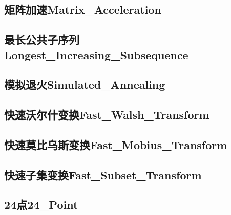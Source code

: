 \documentclass[10pt,a4paper]{article}
\begin{document}
\subsection{矩阵加速Matrix\_Acceleration}

\subsection{最长公共子序列Longest\_Increasing\_Subsequence}

\subsection{模拟退火Simulated\_Annealing}

\subsection{快速沃尔什变换Fast\_Walsh\_Transform}

\subsection{快速莫比乌斯变换Fast\_Mobius\_Transform}

\subsection{快速子集变换Fast\_Subset\_Transform}

\subsection{24点24\_Point}

\end{document}
